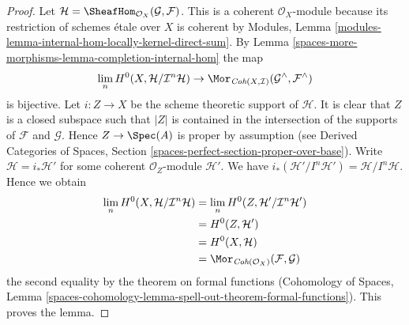 \begin{proof}
Let $\mathcal{H} = \SheafHom_{\mathcal{O}_X}(\mathcal{G}, \mathcal{F})$.
This is a coherent $\mathcal{O}_X$-module because its restriction
of schemes \'etale over $X$ is coherent by
Modules, Lemma \ref{modules-lemma-internal-hom-locally-kernel-direct-sum}.
By Lemma \ref{spaces-more-morphisms-lemma-completion-internal-hom} the map
$$
\lim_n H^0(X, \mathcal{H}/\mathcal{I}^n\mathcal{H})
\to
\Mor_{\textit{Coh}(X, \mathcal{I})}
(\mathcal{G}^\wedge, \mathcal{F}^\wedge)
$$
is bijective. Let $i : Z \to X$ be the scheme theoretic support of
$\mathcal{H}$. It is clear that $Z$ is a closed subspace such
that $|Z|$ is contained in the intersection of the supports of $\mathcal{F}$
and $\mathcal{G}$. Hence $Z \to \Spec(A)$ is proper by assumption
(see Derived Categories of Spaces, Section
\ref{spaces-perfect-section-proper-over-base}).
Write $\mathcal{H} = i_*\mathcal{H}'$ for some coherent
$\mathcal{O}_Z$-module $\mathcal{H}'$. We have
$i_*(\mathcal{H}'/I^n\mathcal{H}') = \mathcal{H}/I^n\mathcal{H}$.
Hence we obtain
\begin{align*}
\lim_n H^0(X, \mathcal{H}/\mathcal{I}^n\mathcal{H})
& =
\lim_n H^0(Z, \mathcal{H}'/\mathcal{I}^n\mathcal{H}') \\
& =
H^0(Z, \mathcal{H}') \\
& =
H^0(X, \mathcal{H}) \\
& =
\Mor_{\textit{Coh}(\mathcal{O}_X)}(\mathcal{F}, \mathcal{G})
\end{align*}
the second equality by the theorem on formal functions
(Cohomology of Spaces, Lemma
\ref{spaces-cohomology-lemma-spell-out-theorem-formal-functions}).
This proves the lemma.
\end{proof}

